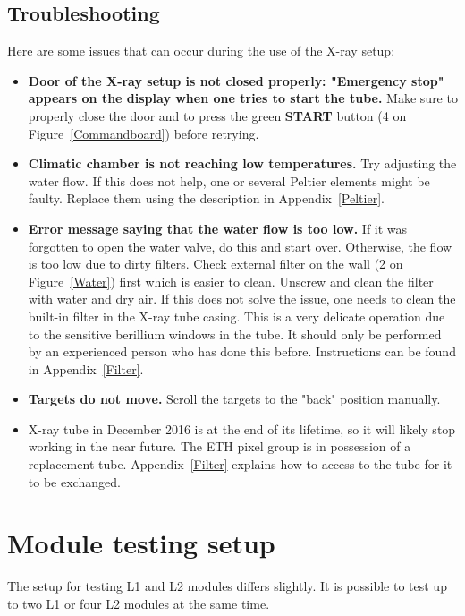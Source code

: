 \documentclass[a4paper,12pt,twoside]{article}
\begin{document}
\subsection{Troubleshooting}
Here are some issues that can occur during the use of the X-ray setup:
\begin{itemize}
\item \textbf{Door of the X-ray setup is not closed properly: "Emergency stop" appears on the display when one tries to start the tube.} Make sure to properly close the door and to press the green \textbf{START} button (4 on Figure~\ref{Commandboard}) before retrying.
\item \textbf{Climatic chamber is not reaching low temperatures.} Try adjusting the water flow. If this does not help, one or several Peltier elements might be faulty. Replace them using the description in Appendix~\ref{Peltier}.
\item \textbf{Error message saying that the water flow is too low.} If it was forgotten to open the water valve, do this and start over. Otherwise, the flow is too low due to dirty filters. Check external filter on the wall (2 on Figure~\ref{Water}) first which is easier to clean. Unscrew and clean the filter with water and dry air. If this does not solve the issue, one needs to clean the built-in filter in the X-ray tube casing. This is a very delicate operation due to the sensitive berillium windows in the tube. It should only be performed by an experienced person who has done this before. Instructions can be found in Appendix~\ref{Filter}.
\item \textbf{Targets do not move.} Scroll the targets to the "back" position manually.
\item X-ray tube in December 2016 is at the end of its lifetime, so it will likely stop working in the near future. The ETH pixel group is in possession of a replacement tube. Appendix~\ref{Filter} explains how to access to the tube for it to be exchanged. 
\end{itemize}


\section{Module testing setup}

The setup for testing L1 and L2 modules differs slightly. It is possible to test up to two L1 or four L2 modules at the same time.
\end{document}
